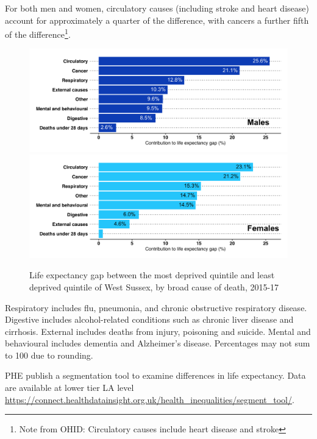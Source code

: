 For both men and women, circulatory causes (including stroke and heart disease) account for approximately a quarter of the difference, with cancers a further fifth of the difference\footnote{Note from OHID: Circulatory causes include heart disease and stroke}.

\begin{figure}[htp]
    \caption{Life expectancy gap between the most deprived quintile and least deprived quintile of West Sussex, by broad cause of death, 2015-17}
    \centering
	\includegraphics[width=\linewidth]{images/male_life_expectancy_gap.png}
	\includegraphics[width=\linewidth]{images/female_life_expectancy_gap.png}
	\label{fig:life_exp_gap}
\end{figure}

Respiratory includes flu, pneumonia, and chronic obstructive respiratory disease. Digestive includes alcohol-related conditions such as chronic liver disease and cirrhosis. External includes deaths from injury, poisoning and suicide. Mental and behavioural includes dementia and Alzheimer's disease. Percentages may not sum to 100 due to rounding.

PHE publish a segmentation tool to examine differences in life expectancy. Data are available at lower tier LA level \url{https://connect.healthdatainsight.org.uk/health_inequalities/segment_tool/}.

